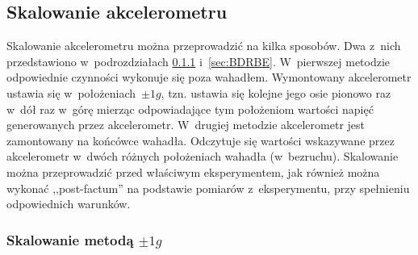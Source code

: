 \documentclass[paper=a4,DIV=12]{lpas}
\begin{document}
\subsection{Skalowanie akcelerometru}
\label{sec:DHEMO}

Skalowanie akcelerometru można przeprowadzić na kilka sposobów. Dwa z~nich
przedstawiono w~podrozdziałach \ref{sec:CT4YN} i~\ref{sec:BDRBE}. W~pierwszej
metodzie odpowiednie czynności wykonuje się poza wahadłem. Wymontowany
akcelerometr ustawia się w~położeniach~$\pm 1g$, tzn.  ustawia się kolejne jego
osie pionowo raz w~dół raz w~górę mierząc odpowiadające tym położeniom wartości
napięć generowanych przez akcelerometr.  W~drugiej metodzie akcelerometr jest
zamontowany na końcówce wahadła. Odczytuje się wartości wskazywane przez
akcelerometr w~dwóch różnych położeniach wahadła (w~bezruchu). Skalowanie można
przeprowadzić przed właściwym eksperymentem, jak również można wykonać
,,post-factum'' na podstawie pomiarów z~eksperymentu, przy spełnieniu
odpowiednich warunków.

\subsubsection{Skalowanie metodą \texorpdfstring{$\pm 1g$}{±1g}}
\label{sec:CT4YN}
\end{document}
